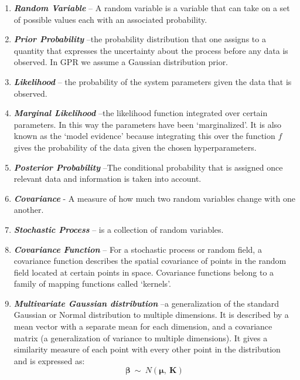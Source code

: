 \documentclass[10.5pt,a4paper,twoside]{report}   %
\begin{document}
\begin{enumerate}
\item \textbf{\textit{Random Variable}} -- A random variable is a variable that can take on a set of possible values each with an associated probability. 

\item  \textbf{\textit{Prior Probability }}--the probability distribution that one assigns to a quantity that expresses the uncertainty about the process before any data is observed. In GPR we assume a Gaussian distribution prior.

\item  \textbf{\textit{Likelihood }}-- the probability of the system parameters given the data that is observed.

\item  \textbf{\textit{Marginal Likelihood }}--the likelihood function integrated over certain parameters. In this way the parameters have been `marginalized'. It is also known as the `model evidence' because integrating this over the function $f$   gives the probability of the data given the chosen hyperparameters. 

\item  \textbf{\textit{Posterior Probability }}--The conditional probability that is assigned once relevant data and information is taken into account. 

\item  \textbf{\textit{Covariance}} - A measure of how much two random variables change with one another. 

\item  \textbf{\textit{Stochastic Process}} -- is a collection of random variables. 

\item  \textbf{\textit{Covariance Function}} -- For a stochastic process or random field, a covariance function describes the spatial covariance of points in the random field located at certain points in space. Covariance functions belong to a family of mapping functions called `kernels'.  

\item  \textbf{\textit{Multivariate Gaussian distribution}} --a generalization of the standard Gaussian or Normal distribution to multiple dimensions. It is described by a mean vector with a separate mean for each dimension, and a covariance matrix (a generalization of variance to multiple dimensions). It gives a similarity measure of each point with every other point in the distribution and is expressed as:
\[{\mathbf \beta }\ \sim \ N({\mathbf \mu },\ {\mathbf K})\] 
\end{enumerate}
\end{document}
